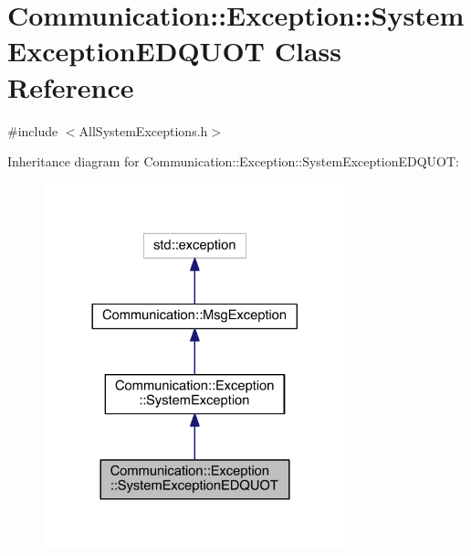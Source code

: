 \hypertarget{class_communication_1_1_exception_1_1_system_exception_e_d_q_u_o_t}{}\section{Communication\+:\+:Exception\+:\+:System\+Exception\+E\+D\+Q\+U\+O\+T Class Reference}
\label{class_communication_1_1_exception_1_1_system_exception_e_d_q_u_o_t}


{\ttfamily \#include $<$All\+System\+Exceptions.\+h$>$}



Inheritance diagram for Communication\+:\+:Exception\+:\+:System\+Exception\+E\+D\+Q\+U\+O\+T\+:\nopagebreak
\begin{figure}[H]
\begin{center}
\leavevmode
\includegraphics[width=248pt]{class_communication_1_1_exception_1_1_system_exception_e_d_q_u_o_t__inherit__graph}
\end{center}
\end{figure}


